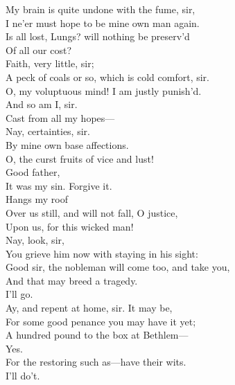 \documentclass[a4paper,oneside]{memoir}
\begin{document}
\begin{drama*}
\facespeaks {} My brain is quite undone with the fume, sir,\\
I ne'er must hope to be mine own man again.\\
\mammonspeaks Is all lost, Lungs? will nothing be preserv'd\\
Of all our cost?\\
\facespeaks {} Faith, very little, sir;\\
A peck of coals or so, which is cold comfort, sir.\\
\mammonspeaks O, my voluptuous mind! I am justly punish'd.\\
\facespeaks And so am I, sir.\\
\mammonspeaks {} Cast from all my hopes---\\
\facespeaks Nay, certainties, sir.\\
\mammonspeaks {} By mine own base affections.\\
\subtlespeaks {}
O, the curst fruits of vice and lust!\\
\mammonspeaks {} Good father,\\
It was my sin. Forgive it.\\
\subtlespeaks {} Hangs my roof\\
Over us still, and will not fall, O justice,\\
Upon us, for this wicked man!\\
\facespeaks {} Nay, look, sir,\\
You grieve him now with staying in his sight:\\
Good sir, the nobleman will come too, and take you,\\
And that may breed a tragedy.\\
\mammonspeaks {} I'll go.\\
\facespeaks Ay, and repent at home, sir. It may be,\\
For some good penance you may have it yet;\\
A hundred pound to the box at Bethlem---\\
\mammonspeaks Yes.\\
\facespeaks {} For the restoring such as---have their wits.\\
\mammonspeaks I'll do't.\\

\end{drama*}
\end{document}
